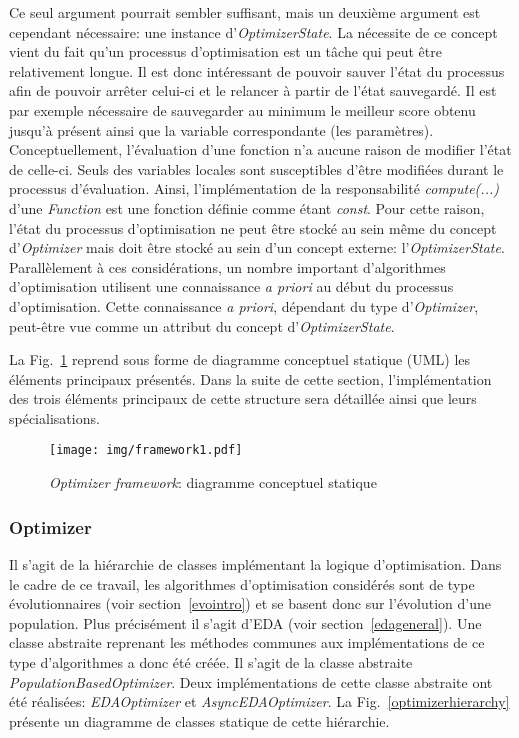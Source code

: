\documentclass[a4paper, 11pt]{report}
\begin{document}
Ce seul argument pourrait sembler suffisant, mais un deuxième argument est cependant nécessaire: une instance d'\textit{OptimizerState}. La nécessite de ce concept vient du fait qu'un processus d'optimisation est un tâche qui peut être relativement longue. Il est donc intéressant de pouvoir sauver l'état du processus afin de pouvoir arrêter celui-ci et le relancer à partir de l'état sauvegardé. Il est par exemple nécessaire de sauvegarder au minimum le meilleur score obtenu jusqu'à présent ainsi que la variable correspondante (les paramètres). Conceptuellement, l'évaluation d'une fonction n'a aucune raison de modifier l'état de celle-ci. Seuls des variables locales sont susceptibles d'être modifiées durant le processus d'évaluation. Ainsi, l'implémentation de la responsabilité \textit{compute(...)} d'une \textit{Function} est une fonction définie comme étant \textit{const}. Pour cette raison, l'état du processus d'optimisation ne peut être stocké au sein même du concept d'\textit{Optimizer} mais doit être stocké au sein d'un concept externe: l'\textit{OptimizerState}. Parallèlement à ces considérations, un nombre important d'algorithmes d'optimisation utilisent une connaissance \textit{a priori} au début du processus d'optimisation. Cette connaissance \textit{a priori}, dépendant du type d'\textit{Optimizer}, peut-être vue comme un attribut du concept d'\textit{OptimizerState}. %
 
La Fig.~\ref{framework1} reprend sous forme de diagramme conceptuel statique (UML) les éléments principaux présentés. Dans la suite de cette section, l'implémentation des trois éléments principaux de cette structure sera détaillée ainsi que leurs spécialisations.

\begin{figure}[!h]
\centering
\texttt{[image: img/framework1.pdf]}
\caption{\textit{Optimizer framework}: diagramme conceptuel statique}
\label{framework1}
\end{figure}

\subsubsection{Optimizer}
Il s'agit de la hiérarchie de classes implémentant la logique d'optimisation. Dans le cadre de ce travail, les algorithmes d'optimisation considérés sont de type évolutionnaires (voir section~\ref{evointro}) et se basent donc sur l'évolution d'une population. Plus précisément il s'agit d'EDA (voir section~\ref{edageneral}). Une classe abstraite reprenant les méthodes communes aux implémentations de ce type d'algorithmes a donc été créée. Il s'agit de la classe abstraite \textit{PopulationBasedOptimizer}. Deux implémentations de cette classe abstraite ont été réalisées: \textit{EDAOptimizer} et \textit{AsyncEDAOptimizer}. La Fig.~\ref{optimizerhierarchy} présente un diagramme de classes statique de cette hiérarchie.
\end{document}
